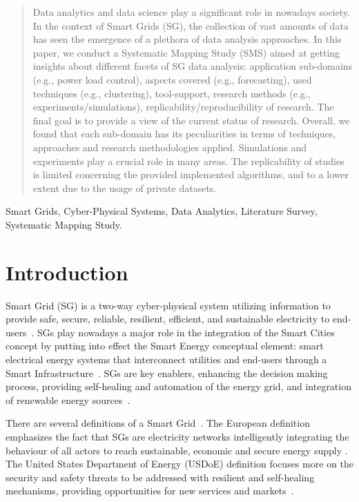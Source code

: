 \documentclass[journal]{IEEEtran}
\begin{document}
\begin{abstract}
Data analytics and data science play a significant role in nowadays society. In the context of Smart Grids (SG), the collection of vast amounts of data has seen the emergence of a plethora of data analysis approaches. In this paper, we conduct a Systematic Mapping Study (SMS) aimed at getting insights about different facets of SG data analysis: application sub-domains (e.g., power load control), aspects covered (e.g., forecasting), used techniques (e.g., clustering), tool-support, research methods (e.g., experiments/simulations), replicability/reproducibility of research. The final goal is to provide a view of the current status of research. Overall, we found that each sub-domain has its peculiarities in terms of techniques, approaches and research methodologies applied. Simulations and experiments play a crucial role in many areas. The replicability of studies is limited concerning the provided implemented algorithms, and to a lower extent due to the usage of private datasets.
\end{abstract}

\begin{IEEEkeywords}
Smart Grids, Cyber-Physical Systems, Data Analytics, Literature Survey, Systematic Mapping Study.
\end{IEEEkeywords}



\section{Introduction}
 Smart Grid (SG) is a two-way cyber-physical system utilizing information to provide safe, secure, reliable, resilient, efficient, and sustainable electricity to end-users~\cite{ref:fang2012, ref:chren2016smart}. SGs play nowadays a major role in the integration of the Smart Cities concept by putting into effect the Smart Energy conceptual element: smart electrical energy systems that interconnect utilities and end-users through a Smart Infrastructure~\cite{ref:geisler2013SG-SC,ref:bonetto2017smart,ref:eremia2017smart}. SGs are key enablers, enhancing the decision making process, providing self-healing and automation of the energy grid, and integration of renewable energy sources~\cite{ref:geisler2013SG-SC}.

There are several definitions of a Smart Grid~\cite{ref:clastres2011smart}. The European definition emphasizes the fact that SGs are electricity networks intelligently integrating the behaviour of all actors to reach sustainable, economic and secure energy supply \cite{ref:ESTP2006}. The United States Department of Energy (USDoE) definition focuses more on the security and safety threats to be addressed with resilient and self-healing mechanisms, providing opportunities for new services and markets~\cite{ref:USDoE2004}.
\end{document}
